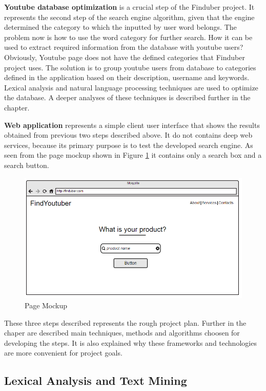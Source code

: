 \textbf{Youtube database optimization} is a crucial step of the Finduber project. It represents the second step of the search engine algorithm, given that the engine determined the category to which the inputted by user word belongs. The problem now is how to use the word category for further search. How it can be used to extract required information from the database with youtube users? Obviously, Youtube page does not have the defined categories that Finduber project uses. The solution is to group youtube users from database to categories defined in the application based on their description, username and keywords. Lexical analysis and natural language processing techniques are used to optimize the database. A deeper analyses of these techniques is described further in the chapter. 

\textbf{Web application} represents a simple client user interface that shows the results obtained from previous two steps described above. It do not contains deep web services, because its primary purpose is to test the developed search engine. As seen from the page mockup shown in Figure \ref{pagemockup} it contains only a search box and a search button.

\begin{figure}[!ht]
\centering
\includegraphics[width=15cm]{moch}
\caption{Page Mockup} \label{pagemockup}
\end{figure}

These three steps described represents the rough project plan. Further in the chaper are described main techniques, methods and algorithms choosen for developing the steps. It is also explained why these frameworks and technologies are more convenient for project goals. 

\subsection{Lexical Analysis and Text Mining} \label{ssec:lexical}

